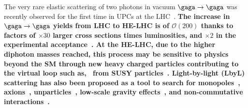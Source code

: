 \documentclass[../report.tex]{subfiles}
\begin{document}
The very rare elastic scattering of two photons in vacuum
$\gaga\to\gaga$  was recently
observed for the first time in UPCs at the LHC~\cite{Aaboud:2017bwk,CMS-PAS-FSQ-16-012}.
{\bf The increase in $\gaga\to\gaga$ yields from LHC to HE-LHC is of $\mathcal{O}(200)$ thanks to factors
of $\times 30$ larger cross sections times luminosities, and $\times 2$ in the experimental acceptance~\cite{d'Enterria:2013yra,d'Enterria:2016qsv}. 
At the HE-LHC, due to the higher diphoton masses
reached, this process may be sensitive to physics beyond the SM through new heavy charged particles contributing to the
virtual loop such as, \eg\ from SUSY
particles~\cite{Gounaris:1999gh}. Light-by-light (LbyL) scattering has also been proposed as a tool to
search for monopoles~\cite{Ginzburg:1998vb}, axions~\cite{Bernard:1997kj}, unparticles~\cite{Kikuchi:2008pr}, 
low-scale gravity effects~\cite{Cheung:1999ja}, and non-commutative interactions~\cite{Hewett:2000zp}.}







 
\end{document}
